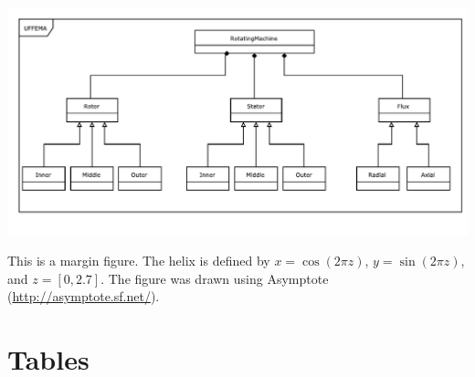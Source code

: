 \documentclass{tufte-book} %
\begin{document}
\begin{marginfigure}
\includegraphics[width=\linewidth]{Overview.pdf}
\caption{This is a margin figure. The helix is defined by $x = \cos(2\pi z)$, $y = \sin(2\pi z)$, and $z = [0, 2.7]$. The figure was drawn using Asymptote (\url{http://asymptote.sf.net/}).}
\label{fig:marginfig}
\end{marginfigure}

\lipsum[2]



\lipsum[3]


\section{Tables} 

\lipsum[4]
\end{document}
